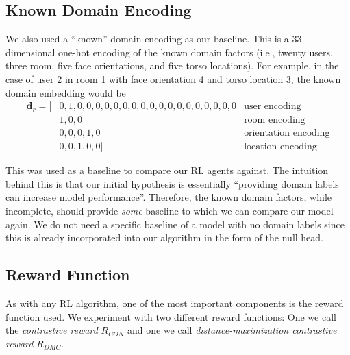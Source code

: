 \subsection{Known Domain Encoding}
We also used a ``known'' domain encoding as our baseline.
This is a 33-dimensional one-hot encoding of the known domain factors (i.e., twenty users, three room, five face orientations, and five torso locations).
For example, in the case of user 2 in room 1 with face orientation 4 and torso location 3, the known domain embedding would be
\begin{align*}
	\boldsymbol{d}_r = [&0,1,0,0,0,0,0,0,0,0,0,0,0,0,0,0,0,0,0,0 & \text{user encoding} \\
	                    &1,0,0                                   & \text{room encoding} \\
	                    &0,0,0,1,0                               & \text{orientation encoding} \\
	                    &0,0,1,0,0]                              & \text{location encoding}
\end{align*}

This was used as a baseline to compare our RL agents against.
The intuition behind this is that our initial hypothesis is essentially ``providing domain labels can increase model performance''.
Therefore, the known domain factors, while incomplete, should provide \textit{some} baseline to which we can compare our model again.
We do not need a specific baseline of a model with no domain labels since this is already incorporated into our algorithm in the form of the null head.

\subsection{Reward Function}\label{subsec:methodology-reward}

As with any RL algorithm, one of the most important components is the reward function used.
We experiment with two different reward functions: One we call the \textit{contrastive reward} $R_{CON}$ and one we call \textit{distance-maximization contrastive reward} $R_{DMC}$.

